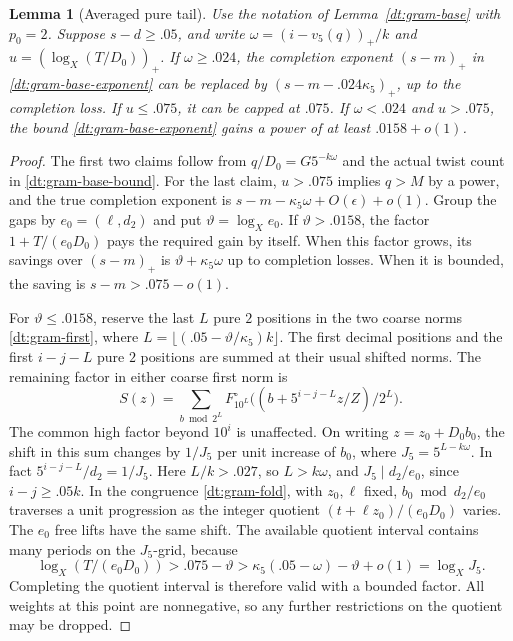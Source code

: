 \documentclass[11pt,a4paper]{article}
\theoremstyle{paperplain}
\newtheorem{lemma}[theorem]{Lemma}
\numberwithin{equation}{section}
\begin{document}
\begin{lemma}[Averaged pure tail]\label{dt:gram-tail}
Use the notation of Lemma~\ref{dt:gram-base} with \(p_0=2\).
Suppose \(s-d\ge.05\), and write
\(\omega=(i-v_5(q))_+/k\) and \(u=(\log_X(T/D_0))_+\).
If \(\omega\ge.024\), the completion exponent \((s-m)_+\)
in \eqref{dt:gram-base-exponent} can be replaced by
\((s-m-.024\kappa_5)_+\), up to the completion loss.
If \(u\le.075\), it can be capped at \(.075\).
If \(\omega<.024\) and \(u>.075\), the bound
\eqref{dt:gram-base-exponent} gains a power of at least
\(.0158+o(1)\).
\end{lemma}

\begin{proof}
The first two claims follow from \(q/D_0=G5^{-k\omega}\)
and the actual twist count in \eqref{dt:gram-base-bound}.
For the last claim, \(u>.075\) implies \(q>M\) by a power,
and the true completion exponent is
\(s-m-\kappa_5\omega+O(\epsilon)+o(1)\).
Group the gaps by \(e_0=(\ell,d_2)\) and put
\(\vartheta=\log_X e_0\). If \(\vartheta>.0158\), the
factor \(1+T/(e_0D_0)\) pays the required gain by itself.
When this factor grows, its savings over \((s-m)_+\) is
\(\vartheta+\kappa_5\omega\) up to completion losses.
When it is bounded, the saving is \(s-m>.075-o(1)\).

For \(\vartheta\le.0158\), reserve the last \(L\) pure \(2\)
positions in the two coarse norms \eqref{dt:gram-first},
where \(L=\lfloor (.05-\vartheta/\kappa_5)k\rfloor\).
The first decimal positions and the first \(i-j-L\) pure
\(2\) positions are summed at their usual shifted norms.
The remaining factor in either coarse first norm is
\[
 S(z)=\sum_{b\bmod 2^L}
       F_{10^L}^\circ\big((b+5^{i-j-L}z/Z)/2^L\big).
\]
The common high factor beyond \(10^i\) is unaffected.
On writing \(z=z_0+D_0 b_0\), the shift in this sum
changes by \(1/J_5\) per unit increase of \(b_0\), where
\(J_5=5^{L-k\omega}\). In fact
\(5^{i-j-L}/d_2=1/J_5\).
Here \(L/k>.027\), so \(L>k\omega\), and
\(J_5\mid d_2/e_0\), since \(i-j\ge.05k\).
In the congruence \eqref{dt:gram-fold}, with \(z_0,\ell\)
fixed, \(b_0\bmod d_2/e_0\) traverses a unit progression
as the integer quotient \((t+\ell z_0)/(e_0D_0)\) varies.
The \(e_0\) free lifts have the same shift.
The available quotient interval contains many periods
on the \(J_5\)-grid, because
\[
 \log_X(T/(e_0D_0))>.075-\vartheta
    >\kappa_5(.05-\omega)-\vartheta+o(1)=\log_X J_5.
\]
Completing the quotient interval is therefore valid with a
bounded factor. All weights at this point are nonnegative,
so any further restrictions on the quotient may be dropped.


\end{proof}
\end{document}
